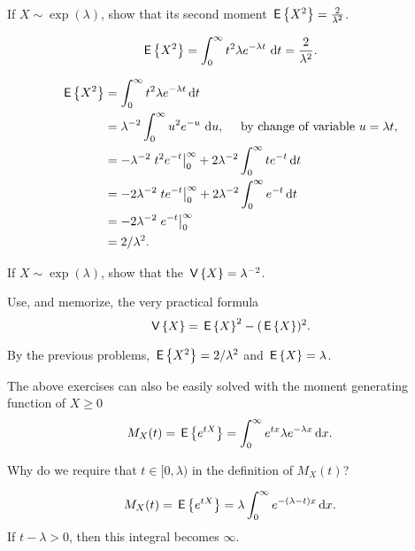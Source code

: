 \begin{exercise} 
  If $X\sim\exp(\lambda)$, show that its second moment $\,\mathsf{E}\left\{X^2\right\} =  \frac{2}{\lambda^2}$.
  \begin{hint}
  \begin{equation*}
  \,\mathsf{E}\left\{X^2\right\}= \int_0^\infty t^2 \lambda e^{-\lambda t}\, \,\text{d}t =  \frac{2}{\lambda^2}.
  \end{equation*}
  \end{hint}
  \begin{solution}
    \begin{equation*}
      \begin{split}
\,\mathsf{E}\left\{X^2\right\} 
&= \int_0^\infty t^2 \lambda e^{-\lambda t} \,\text{d}t \\
&=   \lambda^{-2} \int_0^\infty u^2 e^{-u}\, \,\text{d}u, \quad \text{ by  change of variable $u=\lambda t$},   \\
&= -\lambda^{-2}\left. t^2 e^{- t}\right|_0^\infty + 2\lambda^{-2}\int_0^\infty t e^{- t} \,\text{d}t \\
&=  -2\lambda^{-2}\left. t e^{- t}\right|_0^\infty + 2\lambda^{-2} \int_0^\infty e^{- t} \,\text{d}t\\
&=  - 2\lambda^{-2} \left. e^{- t} \right|_0^\infty \\
&=  2/\lambda^2.
      \end{split}
    \end{equation*}
  \end{solution}
\end{exercise}

\begin{exercise} 
  If $X\sim\exp(\lambda)$, show that the 
$\,\mathsf{V}\left\{X\right\} = \lambda^{-2}$.
  \begin{hint} Use, and memorize, the very practical formula
  \begin{equation*}
  \,\mathsf{V}\left\{X\right\} = \,\mathsf{E}\left\{X\right\}^2 - (\,\mathsf{E}\left\{X\right\})^2.
  \end{equation*}
  \end{hint}
  \begin{solution}
    By the previous problems, $\,\mathsf{E}\left\{X^2\right\}=2/\lambda^2$ and $\,\mathsf{E}\left\{X\right\} = \lambda$. 
  \end{solution}
\end{exercise}

The  above exercises can also be easily solved with the moment generating function of $X\geq 0$
\begin{equation*}
  M_X(t) = \,\mathsf{E}\left\{e^{tX}\right\} = \int_0^\infty e^{tx} \lambda e^{-\lambda x} \,\text{d}x.
\end{equation*}

\begin{exercise}
Why do we require that $t \in [0, \lambda)$ in the definition of $M_X(t)$?
\begin{solution}
\begin{equation*}
  M_X(t) = \,\mathsf{E}\left\{e^{tX}\right\} = \lambda \int_0^\infty e^{-(\lambda-t) x}\,\text{d}x.
\end{equation*}
  If $t - \lambda>0$, then this integral becomes $\infty$. 
\end{solution}
\end{exercise}

